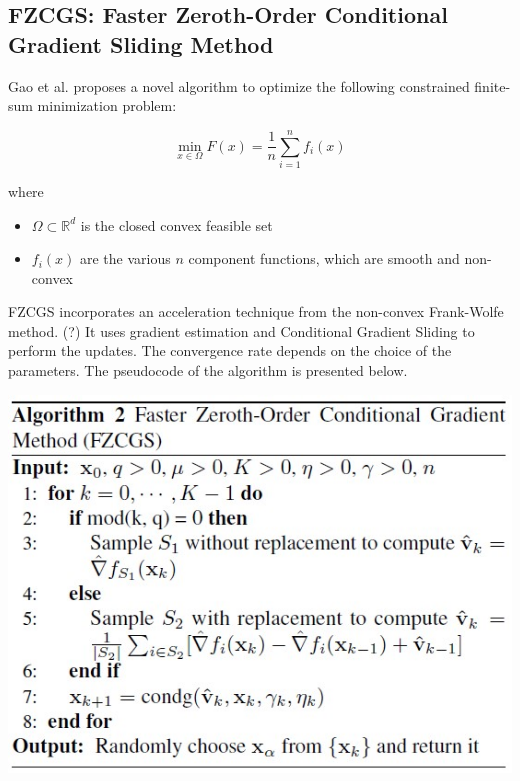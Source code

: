 \documentclass[10pt,twocolumn,letterpaper]{article}
\begin{document}
\subsection{FZCGS: Faster Zeroth-Order Conditional Gradient Sliding Method}

Gao et al. proposes a novel algorithm to optimize the following constrained finite-sum minimization problem:

\[
\min _{x \in \Omega} F(x)=\frac{1}{n} \sum_{i=1}^{n} f_{i}(x)
\]

where

\begin{itemize}

\item $\Omega \subset \mathbb{R}^{d}$ is the closed convex feasible set
\item $f_{i}(x)$ are the various $n$ component functions, which are smooth and non-convex
\end{itemize}


FZCGS incorporates an acceleration technique from the non-convex Frank-Wolfe method. (?)
It uses gradient estimation and Conditional Gradient Sliding to perform the updates.
The convergence rate depends on the choice of the parameters. The pseudocode of the algorithm is presented below.

\includegraphics*[scale=0.7]{img/fzcgs_pseudocode.jpg} \\
\end{document}
